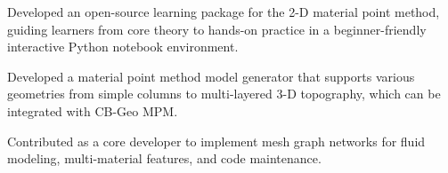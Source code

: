 
\begin{cvbullets}
  \item Developed an open-source learning package for the 2-D material point method, guiding learners from core theory to hands-on practice in a beginner-friendly interactive Python notebook environment.
\end{cvbullets}

\begin{cvbullets}
  \item Developed a material point method model generator that supports various geometries from simple columns to multi-layered 3-D topography, which can be integrated with CB-Geo MPM.
\end{cvbullets}

\begin{cvbullets}
  \item Contributed as a core developer to implement mesh graph networks for fluid modeling, multi-material features, and code maintenance.
\end{cvbullets}

